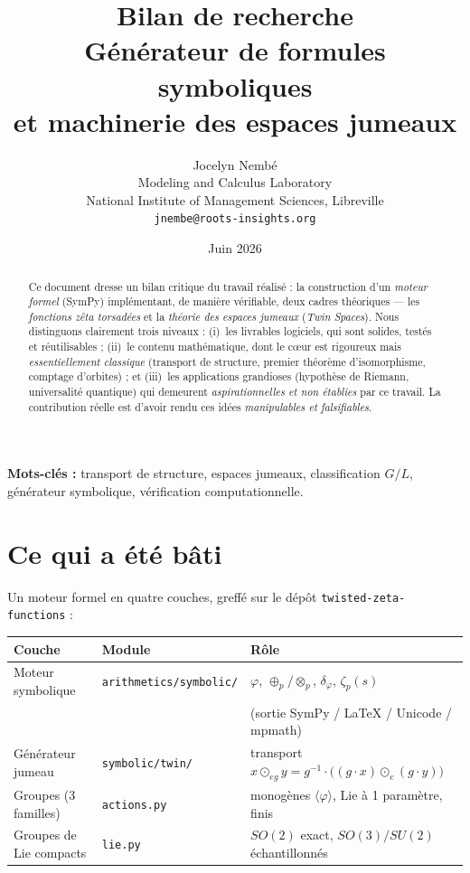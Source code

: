 \documentclass[11pt,a4paper]{article}
\title{\textbf{Bilan de recherche}\\[0.3em]
\large Générateur de formules symboliques\\ et machinerie des espaces jumeaux}
\author{Jocelyn Nemb\'e \\
\small Modeling and Calculus Laboratory \\
\small National Institute of Management Sciences, Libreville \\
\small \texttt{jnembe@roots-insights.org}}
\date{Juin 2026}
\newcommand{\code}[1]{\texttt{#1}}
\theoremstyle{definition}
\begin{document}
\maketitle

\begin{abstract}
\noindent
Ce document dresse un bilan critique du travail réalisé : la construction d'un
\emph{moteur formel} (SymPy) implémentant, de manière vérifiable, deux cadres
théoriques --- les \emph{fonctions zêta torsadées} et la \emph{théorie des
espaces jumeaux} (\emph{Twin Spaces}). Nous distinguons clairement trois
niveaux : (i)~les livrables logiciels, qui sont solides, testés et réutilisables ;
(ii)~le contenu mathématique, dont le c\oe ur est rigoureux mais
\emph{essentiellement classique} (transport de structure, premier théorème
d'isomorphisme, comptage d'orbites) ; et (iii)~les applications grandioses
(hypothèse de Riemann, universalité quantique) qui demeurent
\emph{aspirationnelles et non établies} par ce travail. La contribution réelle
est d'avoir rendu ces idées \emph{manipulables et falsifiables}.
\end{abstract}

\noindent\textbf{Mots-clés :} transport de structure, espaces jumeaux,
classification $G/L$, générateur symbolique, vérification computationnelle.

\section{Ce qui a été bâti}

Un moteur formel en quatre couches, greffé sur le dépôt
\code{twisted-zeta-functions} :

\begin{center}
\begin{tabular}{@{}lll@{}}
\toprule
\textbf{Couche} & \textbf{Module} & \textbf{Rôle} \\
\midrule
Moteur symbolique & \code{arithmetics/symbolic/} &
  $\varphi$, $\oplus_p/\otimes_p$, $\delta_\varphi$, $\zeta_p(s)$ \\
 & & (sortie SymPy / \LaTeX{} / Unicode / mpmath) \\
Générateur jumeau & \code{symbolic/twin/} &
  transport $x \odot_{eg} y = g^{-1}\!\cdot\!\big((g\cdot x)\odot_e(g\cdot y)\big)$ \\
Groupes (3 familles) & \code{actions.py} &
  monogènes $\langle\varphi\rangle$, Lie à 1 paramètre, finis \\
Groupes de Lie compacts & \code{lie.py} &
  $SO(2)$ exact, $SO(3)/SU(2)$ échantillonnés \\
\bottomrule
\end{tabular}
\end{center}
\end{document}
